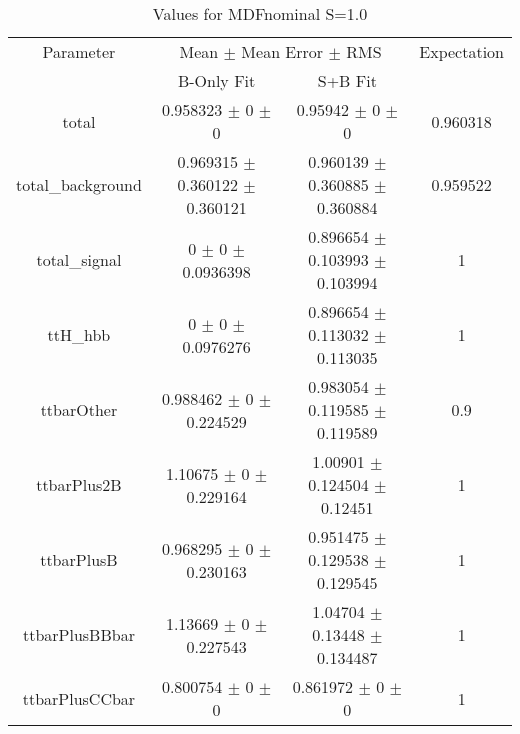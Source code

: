 \begin{table}
\centering
\caption{Values for MDFnominal S=1.0}
\begin{tabular}{cccc}
\toprule
Parameter & \multicolumn{2}{c}{Mean $\pm$ Mean Error $\pm$ RMS} & Expectation\\
 & B-Only Fit & S+B Fit & \\
\midrule
total & \num{0.958323} $\pm$ \num{0} $\pm$ \num{0} & \num{0.95942} $\pm$ \num{0} $\pm$ \num{0} & \num{0.960318}\\
total\_background & \num{0.969315} $\pm$ \num{0.360122} $\pm$ \num{0.360121} & \num{0.960139} $\pm$ \num{0.360885} $\pm$ \num{0.360884} & \num{0.959522}\\
total\_signal & \num{0} $\pm$ \num{0} $\pm$ \num{0.0936398} & \num{0.896654} $\pm$ \num{0.103993} $\pm$ \num{0.103994} & \num{1}\\
ttH\_hbb & \num{0} $\pm$ \num{0} $\pm$ \num{0.0976276} & \num{0.896654} $\pm$ \num{0.113032} $\pm$ \num{0.113035} & \num{1}\\
ttbarOther & \num{0.988462} $\pm$ \num{0} $\pm$ \num{0.224529} & \num{0.983054} $\pm$ \num{0.119585} $\pm$ \num{0.119589} & \num{0.9}\\
ttbarPlus2B & \num{1.10675} $\pm$ \num{0} $\pm$ \num{0.229164} & \num{1.00901} $\pm$ \num{0.124504} $\pm$ \num{0.12451} & \num{1}\\
ttbarPlusB & \num{0.968295} $\pm$ \num{0} $\pm$ \num{0.230163} & \num{0.951475} $\pm$ \num{0.129538} $\pm$ \num{0.129545} & \num{1}\\
ttbarPlusBBbar & \num{1.13669} $\pm$ \num{0} $\pm$ \num{0.227543} & \num{1.04704} $\pm$ \num{0.13448} $\pm$ \num{0.134487} & \num{1}\\
ttbarPlusCCbar & \num{0.800754} $\pm$ \num{0} $\pm$ \num{0} & \num{0.861972} $\pm$ \num{0} $\pm$ \num{0} & \num{1}\\
\bottomrule
\end{tabular}
\end{table}
